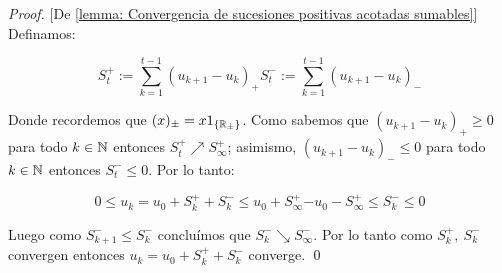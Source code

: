\begin{proof}{[De \ref{lemma: Convergencia de sucesiones positivas acotadas sumables}]}
	Definamos:
	
	\begin{subequations}
		\begin{equation}
			S^+_t := \sum\limits_{k=1}^{t-1} {\left(u_{k+1} - u_k\right)_+}
		\end{equation}
		\begin{equation}
			S^-_t := \sum\limits_{k=1}^{t-1} {\left(u_{k+1} - u_k\right)_-}
		\end{equation}
	\end{subequations}
	
	Donde recordemos que $(x)_{\pm} = x1_{\left\lbrace{\mathbb{R}}_{\pm}\right\rbrace}$. Como sabemos que $ {\left(u_{k+1} - u_k\right)_+} \geq 0$ para todo $k \in {\mathbb{N}}$ entonces $S_t^+ \nearrow S_{\infty}^+$; asimismo,  $ {\left(u_{k+1} - u_k\right)_-} \leq 0$ para todo $k \in {\mathbb{N}}$ entonces $S_t^- \leq 0$. Por lo tanto:
	
	\begin{subequations}
		\begin{equation}
			0 \leq u_k = u_0 + S_k^+ + S_k^- \leq u_0 + S_{\infty}^+
		\end{equation}
		\begin{equation}
			-u_0 - S_{\infty}^+ \leq S_k^- \leq 0
		\end{equation}
	\end{subequations}
	
	Luego como $S_{k+1}^- \leq S_k^-$ conclu\'imos que $S_{k}^- \searrow S_{\infty}^-$. Por lo tanto como $S_k^+, \ S_k^-$ convergen entonces $u_k = u_0 + S_k^+ + S_k^- $ converge. \qed
	
\end{proof}


